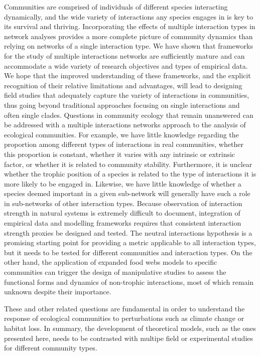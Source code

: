 Communities are comprised of individuals of different species interacting dynamically, and the wide variety of interactions any species engages in is key to its survival and thriving. Incorporating the effects of multiple interaction types in network analyses provides a more complete picture of community dynamics than relying on networks of a single interaction type. We have shown that frameworks for the study of multiple interactions networks are sufficiently mature and can accommodate a wide variety of research objectives and types of empirical data. We hope that the improved understanding of these frameworks, and the explicit recognition of their relative limitations and advantages, will lead to designing field studies that adequately capture the variety of interactions in communities, thus going beyond traditional approaches focusing on single interactions and often single clades. Questions in community ecology that remain unanswered can be addressed with a multiple interactions networks approach to the analysis of ecological communities. For example, we have little knowledge regarding the proportion among different types of interactions in real communities, whether this proportion is constant, whether it varies with any intrinsic or extrinsic factor, or whether it is related to community stability. Furthermore, it is unclear whether the trophic position of a species is related to the type of interactions it is more likely to be engaged in. Likewise, we have little knowledge of whether a species deemed important in a given sub-network will generally have such a role in sub-networks of other interaction types. Because observation of interaction strength in natural systems is extremely difficult to document, integration of empirical data and modelling frameworks requires that consistent interaction strength proxies be designed and tested. The neutral interactions hypothesis is a promising starting point for providing a metric applicable to all interaction types, but it needs to be tested for different communities and interaction types. On the other hand, the application of expanded food webs models to specific communities can trigger the design of manipulative studies to assess the functional forms and dynamics of non-trophic interactions, most of which remain unknown despite their importance.

These and other related questions are fundamental in order to understand the response of ecological communities to perturbations such as climate change or habitat loss. In summary, the development of theoretical models, such as the ones presented here, needs to be contrasted with multipe field or experimental studies for different community types.
